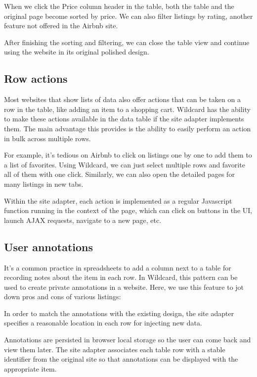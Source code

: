 \documentclass[english,submission]{programming}
\begin{document}
When we click the Price column header in the table, both the table and
the original page become sorted by price. We can also filter listings by
rating, another feature not offered in the Airbnb site.

After finishing the sorting and filtering, we can close the table view
and continue using the website in its original polished design.

\hypertarget{row-actions}{%
\subsection{Row actions}\label{row-actions}}

Most websites that show lists of data also offer actions that can be
taken on a row in the table, like adding an item to a shopping cart.
Wildcard has the ability to make these actions available in the data
table if the site adapter implements them. The main advantage this
provides is the ability to easily perform an action in bulk across
multiple rows.

For example, it's tedious on Airbnb to click on listings one by one to
add them to a list of favorites. Using Wildcard, we can just select
multiple rows and favorite all of them with one click. Similarly, we can
also open the detailed pages for many listings in new tabs.

Within the site adapter, each action is implemented as a regular
Javascript function running in the context of the page, which can click
on buttons in the UI, launch AJAX requests, navigate to a new page, etc.

\hypertarget{user-annotations}{%
\subsection{User annotations}\label{user-annotations}}

It's a common practice in spreadsheets to add a column next to a table
for recording notes about the item in each row. In Wildcard, this
pattern can be used to create private annotations in a website. Here, we
use this feature to jot down pros and cons of various listings:

In order to match the annotations with the existing design, the site
adapter specifies a reasonable location in each row for injecting new
data.

Annotations are persisted in browser local storage so the user can come
back and view them later. The site adapter associates each table row
with a stable identifier from the original site so that annotations can
be displayed with the appropriate item.
\end{document}
